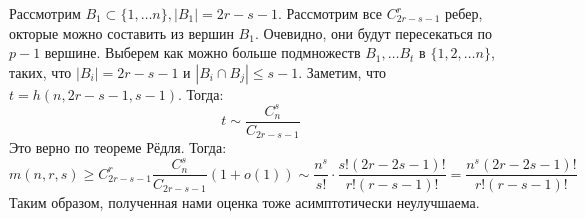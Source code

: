Рассмотрим \(B_1 \subset \{1, \dots n\}, |B_1| = 2r - s - 1\). Рассмотрим все \(C_{2r - s - 1}^r\) ребер, окторые можно составить из вершин \(B_1\). Очевидно, они будут пересекаться по \(p - 1\) вершине. Выберем как можно больше подмножеств \(B_1, \dots B_t\) в \(\{1, 2, \dots n\}\), таких, что \(|B_i| = 2r - s - 1\) и \(|B_i \cap B_j| \le s - 1\). Заметим, что \(t = h(n, 2r - s - 1, s - 1)\). Тогда:
\[t \sim \frac{C_n^s}{C_{2r - s - 1}}\]
Это верно по теореме Рёдля. Тогда:
\[m(n, r, s) \ge C_{2r - s - 1}^r \frac{C_n^s}{C_{2r - s - 1}} (1 + o(1)) \sim \frac{n^s}{s!} \cdot \frac{s!(2r - 2s - 1)!}{r!(r - s - 1)!} = \frac{n^s(2r - 2s - 1)!}{r!(r - s - 1)!}\]
Таким образом, полученная нами оценка тоже асимптотически неулучшаема.

